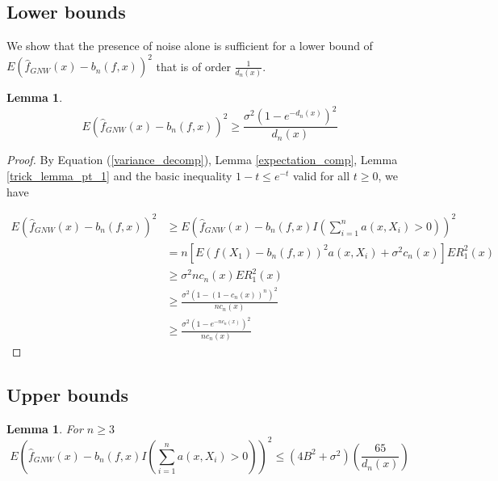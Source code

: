 \documentclass{article}
\newtheorem{lemma}[theorem]{Lemma}
\begin{document}
\subsection{Lower bounds}
We show that the presence of noise alone is sufficient for a lower bound of $E(\hat{f}_{GNW}(x)-b_n(f,x))^2$ that is of order $\frac{1}{d_n(x)}$.  
\begin{lemma}
\label{variance_lower_bound}
\begin{equation*}
    E(\hat{f}_{GNW}(x)-b_n(f,x))^2\geq \frac{\sigma^2(1-e^{-d_n(x)})^2}{d_n(x)}
\end{equation*}

\end{lemma}

\begin{proof}
By Equation (\ref{variance_decomp}), Lemma
\ref{expectation_comp}, Lemma  
\ref{trick_lemma_pt_1} and the basic inequality  $1-t\leq e^{-t}$ valid for all $t\geq 0$, we have

\begin{equation}
\begin{split}
E(\hat{f}_{GNW}(x)-b_n(f,x))^2&\geq E(\hat{f}_{GNW}(x)-b_n(f,x)I(\sum_{i=1}^n a(x,X_i)>0))^2\\
&=n[E(f(X_1)-b_n(f,x))^2a(x,X_i)+\sigma^2c_n(x)]ER_1^2(x)\\
&\geq \sigma^2nc_n(x)ER_1^2(x)\\
&\geq \frac{\sigma^2(1-(1-c_n(x))^n)^2}{nc_n(x)}\\
&\geq \frac{\sigma^2(1-e^{-nc_n(x)})^2}{nc_n(x)}
\end{split}
\end{equation}

\end{proof}

\subsection{Upper bounds}

\begin{lemma} 
\label{trick_lemma_pt2}
For $n\geq 3$
\begin{equation*}
    E(\hat{f}_{GNW}(x)-b_n(f,x)I(\sum_{i=1}^n a(x,X_i)>0))^2\leq (4B^2+\sigma^2)(\frac{65}{d_n(x)})
\end{equation*}

\end{lemma}
\end{document}

